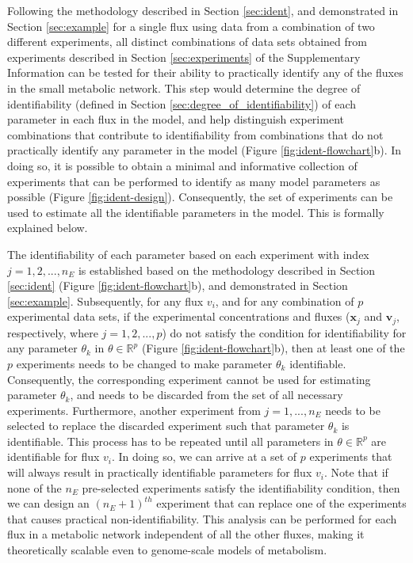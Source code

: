 \documentclass[10pt]{article}
\begin{document}
	Following the methodology described in Section \ref{sec:ident}, and demonstrated in Section \ref{sec:example} for a single flux using data from a combination of two different experiments, all distinct combinations of data sets obtained from experiments described in Section \ref{sec:experiments} of the Supplementary Information can be tested for their ability to practically identify any of the fluxes in the small metabolic network. This step would determine the degree of identifiability (defined in Section \ref{sec:degree_of_identifiability}) of each parameter in each flux in the model, and help distinguish experiment combinations that contribute to identifiability from combinations that do not practically identify any parameter in the model (Figure \ref{fig:ident-flowchart}b). In doing so, it is possible to obtain a minimal and informative collection of experiments that can be performed to identify as many model parameters as possible (Figure \ref{fig:ident-design}). Consequently, the set of experiments can be used to estimate all the identifiable parameters in the model. This is formally explained below.
	
	The identifiability of each parameter based on each experiment with index $j = {1, 2, ..., n_E}$ is established based on the methodology described in Section \ref{sec:ident} (Figure \ref{fig:ident-flowchart}b), and demonstrated in Section \ref{sec:example}. Subsequently, for any flux $v_i$, and for any combination of $p$ experimental data sets, if the experimental concentrations and fluxes ($\mathbf{x}_j$ and $\mathbf{v}_j$, respectively, where $j = {1, 2,..., p}$) do not satisfy the condition for identifiability for any parameter $\theta_k$ in $\theta\in\mathbb{R}^p$ (Figure \ref{fig:ident-flowchart}b), then at least one of the $p$ experiments needs to be changed to make parameter $\theta_k$ identifiable. Consequently, the corresponding experiment cannot be used for estimating parameter $\theta_k$, and needs to be discarded from the set of all necessary experiments. Furthermore, another experiment from $j = {1, ..., n_E}$ needs to be selected to replace the discarded experiment such that parameter $\theta_k$ is identifiable. This process has to be repeated until all parameters in $\theta\in\mathbb{R}^p$ are identifiable for flux $v_i$. In doing so, we can arrive at a set of $p$ experiments that will always result in practically identifiable parameters for flux $v_i$. Note that if none of the $n_E$ pre-selected experiments satisfy the identifiability condition, then we can design an $(n_E+1)^{th}$ experiment that can replace one of the experiments that causes practical non-identifiability. This analysis can be performed for each flux in a metabolic network independent of all the other fluxes, making it theoretically scalable even to genome-scale models of metabolism. 	
	
\end{document}

